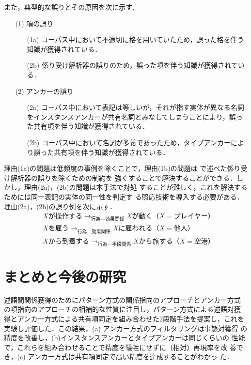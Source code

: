 \documentclass[japanese]{jnlp_1.4}
\begin{document}
また，典型的な誤りとその原因を次に示す．
\begin{itemize}
\item[(1)] 項の誤り
\begin{itemize}
\item[(1a)] コーパス中において不適切に格を用いていたため，誤った格を伴う知識が獲得されている．
\item[(2b)] 係り受け解析器の誤りのため，誤った項を伴う知識が獲得されている．
\end{itemize}
\item[(2)] アンカーの誤り
\begin{itemize}
\item[(2a)] コーパス中において表記は等しいが，それが指す実体が異なる名詞をインスタンスアンカーが共有名詞とみなしてしまうことにより，誤った共有項を伴う知識が獲得されている．
\item[(2b)] コーパス中において名詞が多義であったため，タイプアンカーにより誤った共有項を伴う知識が獲得されている．
\end{itemize}
\end{itemize}
理由(1a)の問題は低頻度の事例を除くことで，理由(1b)の問題は
で述べた係り受け解析器の誤りを除くための制約を
強くすることで解決することができる．しかし，理由(2a)，(2b)の問題は本手法で対処
することが難しく，これを解決するためには同一表記の実体の同一性を判定す
る照応技術を導入する必要がある．理由(2a)，(2b)の誤り例を次に示す．
\begin{align*}
  & X が操作する \rightarrow_{行為—効果関係} Xが動く （X= プレイヤー）\\
  & X を雇う \rightarrow_{行為—効果関係} X に雇われる （X= 他人）\\
  & X から到着する \rightarrow_{行為—手段関係} X から旅する （X=空港）
\end{align*}



\section{まとめと今後の研究}
\label{sec:discussion}

述語間関係獲得のためにパターン方式の関係指向のアプローチとアンカー方式
の項指向のアプローチの相補的な性質に注目し，パターン方式による述語対獲
得とアンカー方式による共有項同定を組み合わせた2段階手法を提案し，これを
実験し評価した．この結果，(a) アンカー方式のフィルタリングは事態対獲得
の精度を改善し，(b)インスタンスアンカーとタイプアンカーは同じくらいの
性能で，これらを組み合わせることで精度を犠牲にせずに（相対）再現率を改
善でき，(c) アンカー方式は共有項同定で高い精度を達成することがわかっ
た．
\end{document}
